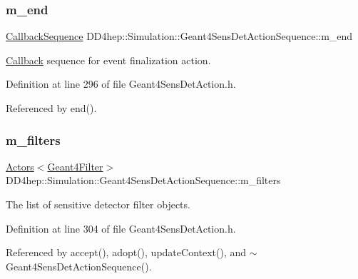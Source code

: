 \subsubsection{\texorpdfstring{m\+\_\+end}{m\_end}}
{\footnotesize\ttfamily \hyperlink{struct_d_d4hep_1_1_callback_sequence}{Callback\+Sequence} D\+D4hep\+::\+Simulation\+::\+Geant4\+Sens\+Det\+Action\+Sequence\+::m\+\_\+end\hspace{0.3cm}{\ttfamily [protected]}}



\hyperlink{class_d_d4hep_1_1_callback}{Callback} sequence for event finalization action. 



Definition at line 296 of file Geant4\+Sens\+Det\+Action.\+h.



Referenced by end().

\hypertarget{class_d_d4hep_1_1_simulation_1_1_geant4_sens_det_action_sequence_a67b12a0e51d5249be593f874182155ab}{}\label{class_d_d4hep_1_1_simulation_1_1_geant4_sens_det_action_sequence_a67b12a0e51d5249be593f874182155ab} 
\subsubsection{\texorpdfstring{m\+\_\+filters}{m\_filters}}
{\footnotesize\ttfamily \hyperlink{class_d_d4hep_1_1_simulation_1_1_geant4_action_1_1_actors}{Actors}$<$\hyperlink{class_d_d4hep_1_1_simulation_1_1_geant4_filter}{Geant4\+Filter}$>$ D\+D4hep\+::\+Simulation\+::\+Geant4\+Sens\+Det\+Action\+Sequence\+::m\+\_\+filters\hspace{0.3cm}{\ttfamily [protected]}}



The list of sensitive detector filter objects. 



Definition at line 304 of file Geant4\+Sens\+Det\+Action.\+h.



Referenced by accept(), adopt(), update\+Context(), and $\sim$\+Geant4\+Sens\+Det\+Action\+Sequence().

\hypertarget{class_d_d4hep_1_1_simulation_1_1_geant4_sens_det_action_sequence_a7a64aa4c2cd4c410962f951bd47d2116}{}\label{class_d_d4hep_1_1_simulation_1_1_geant4_sens_det_action_sequence_a7a64aa4c2cd4c410962f951bd47d2116} 
